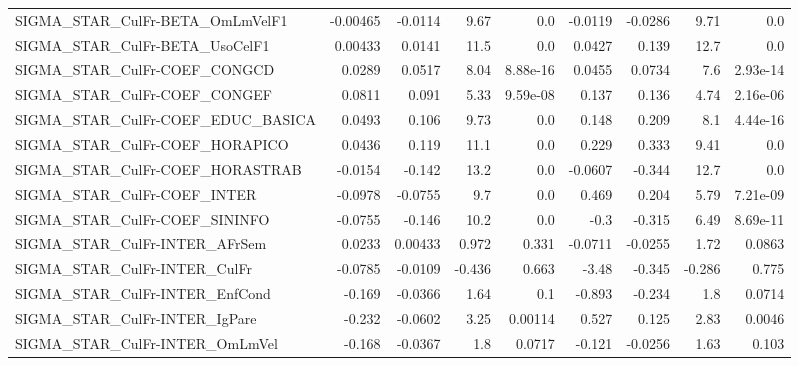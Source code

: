 \begin{tabular}{lrrrrrrrr}
SIGMA\_STAR\_CulFr-BETA\_OmLmVelF1       &    -0.00465 &      -0.0114 &    9.67 &      0.0 &    -0.0119 &     -0.0286 &         9.71 &           0.0 \\
SIGMA\_STAR\_CulFr-BETA\_UsoCelF1        &     0.00433 &       0.0141 &    11.5 &      0.0 &     0.0427 &       0.139 &         12.7 &           0.0 \\
SIGMA\_STAR\_CulFr-COEF\_CONGCD          &      0.0289 &       0.0517 &    8.04 & 8.88e-16 &     0.0455 &      0.0734 &          7.6 &      2.93e-14 \\
SIGMA\_STAR\_CulFr-COEF\_CONGEF          &      0.0811 &        0.091 &    5.33 & 9.59e-08 &      0.137 &       0.136 &         4.74 &      2.16e-06 \\
SIGMA\_STAR\_CulFr-COEF\_EDUC\_BASICA     &      0.0493 &        0.106 &    9.73 &      0.0 &      0.148 &       0.209 &          8.1 &      4.44e-16 \\
SIGMA\_STAR\_CulFr-COEF\_HORAPICO        &      0.0436 &        0.119 &    11.1 &      0.0 &      0.229 &       0.333 &         9.41 &           0.0 \\
SIGMA\_STAR\_CulFr-COEF\_HORASTRAB       &     -0.0154 &       -0.142 &    13.2 &      0.0 &    -0.0607 &      -0.344 &         12.7 &           0.0 \\
SIGMA\_STAR\_CulFr-COEF\_INTER           &     -0.0978 &      -0.0755 &     9.7 &      0.0 &      0.469 &       0.204 &         5.79 &      7.21e-09 \\
SIGMA\_STAR\_CulFr-COEF\_SININFO         &     -0.0755 &       -0.146 &    10.2 &      0.0 &       -0.3 &      -0.315 &         6.49 &      8.69e-11 \\
SIGMA\_STAR\_CulFr-INTER\_AFrSem         &      0.0233 &      0.00433 &   0.972 &    0.331 &    -0.0711 &     -0.0255 &         1.72 &        0.0863 \\
SIGMA\_STAR\_CulFr-INTER\_CulFr          &     -0.0785 &      -0.0109 &  -0.436 &    0.663 &      -3.48 &      -0.345 &       -0.286 &         0.775 \\
SIGMA\_STAR\_CulFr-INTER\_EnfCond        &      -0.169 &      -0.0366 &    1.64 &      0.1 &     -0.893 &      -0.234 &          1.8 &        0.0714 \\
SIGMA\_STAR\_CulFr-INTER\_IgPare         &      -0.232 &      -0.0602 &    3.25 &  0.00114 &      0.527 &       0.125 &         2.83 &        0.0046 \\
SIGMA\_STAR\_CulFr-INTER\_OmLmVel        &      -0.168 &      -0.0367 &     1.8 &   0.0717 &     -0.121 &     -0.0256 &         1.63 &         0.103 \\

\end{tabular}
